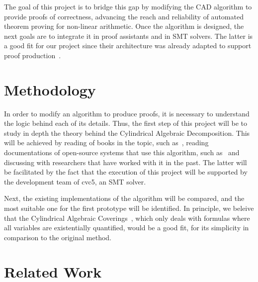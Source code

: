 \documentclass[a4paper, 12pt]{article}
\begin{document}
The goal of this project is to bridge this gap by modifying the CAD algorithm to provide
proofs of correctness, advancing the reach and reliability of automated theorem proving
for non-linear arithmetic. Once the algorithm is designed, the next goals
are to integrate it in proof assistants and in SMT solvers. The latter is a good fit for our
project since their architecture was already adapted to support proof production~\cite{flexibleProofs}.

\section{Methodology}

In order to modify an algorithm to produce proofs, it is necessary to understand the logic behind
each of its details. Thus, the first step of this project will be to study in depth the
theory behind the Cylindrical Algebraic Decomposition. This will be achieved by reading of books in the topic,
such as~\cite{computerAlgebraBook}, reading documentations of open-source systems that use this
algorithm, such as~\cite{sage} and discussing with researchers that have worked with it in the past.
The latter will be facilitated by the fact that the execution of this project will be supported by the
development team of cvc5, an SMT solver.

Next, the existing implementations of the algorithm will be compared, and the most suitable one for the
first prototype will be identified. In principle, we beleive that the Cylindrical Algebraic
Coverings~\cite{coverings}, which only deals with formulas where all variables are existentially quantified,
would be a good fit, for its simplicity in comparison to the original method.





\section{Related Work}




\end{document}
